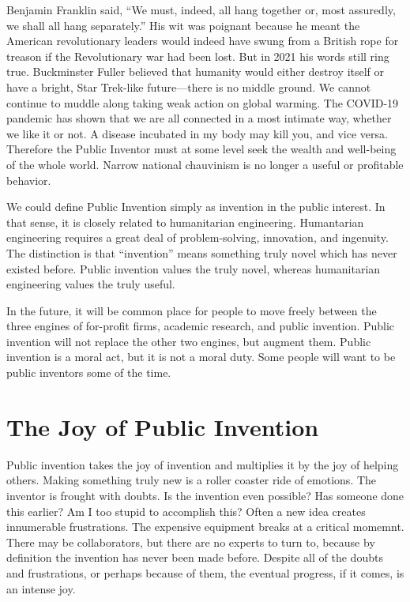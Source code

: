 \documentclass[
	fontsize=10pt, %
	twoside=false, %
	secnumdepth=1, %
]{kaobook}
\begin{document}
Benjamin Franklin said, ``We must, indeed, all hang together or,
most assuredly, we shall all hang separately.''
His wit was poignant because he meant the American revolutionary
leaders would indeed have swung from a British rope for treason
if the Revolutionary war had been lost.
But in 2021 his words still ring true. Buckminster Fuller
believed that humanity would either destroy itself or
have a bright, Star Trek-like future---there is no
middle ground.
We cannot continue to muddle along
taking weak action on global warming.
The COVID-19 pandemic has shown that we are all connected
in a most intimate way, whether we like it or not.
A disease incubated in my body may kill you, and vice versa.
Therefore the Public Inventor must at some level seek
the wealth and well-being of the whole world.
Narrow national chauvinism is no longer a useful or profitable
behavior.

We could define Public Invention simply as invention in the
public interest.
In that sense, it is closely related to humanitarian engineering.
Humantarian engineering requires a great deal of problem-solving,
innovation, and ingenuity. The distinction is that ``invention''
means something truly novel which has never existed before.
Public  invention values the truly novel, whereas
humanitarian engineering values the truly useful.

In the future, it will be common place for people to move freely
between
the three engines of for-profit firms, academic research,
and public invention.
Public invention will not replace the other two engines,
but augment them.
Public invention is a moral act, but it is not a moral duty.
Some people will want to be public inventors some of the time.

\chapter{The Joy of Public Invention}

Public invention takes the joy of invention and multiplies
it by the joy of helping others.
Making something truly new is a roller coaster ride
of emotions.
The inventor is frought with doubts.
Is the invention even possible?
Has someone done this earlier?
Am I too stupid to accomplish this?
Often a new idea creates innumerable frustrations.
The expensive equipment breaks at a critical momemnt.
There may be collaborators,
but there are no experts to turn to, because by definition
the invention has never been made before.
Despite all of the doubts and frustrations, or
perhaps because of them, the eventual progress, if it
comes, is an intense joy.
\end{document}
